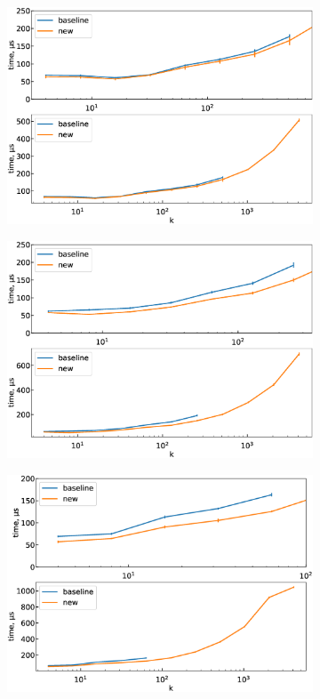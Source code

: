 \documentclass{amsart}
\numberwithin{equation}{section}
\begin{document}
\begin{figure}[t]
    \centering
	\begin{subfigure}[t]{0.3\textwidth}
        \includegraphics[width=\linewidth]{boost_scale_fixed_0_25.eps}
        \caption{}\label{boost-scale-fixed_0_25}
	\end{subfigure}
	\begin{subfigure}[t]{0.3\textwidth}
		\includegraphics[width=\linewidth]{boost_scale_fixed_0_15.eps}
		\caption{}\label{boost-scale-fixed_0_15}
	\end{subfigure}
	\begin{subfigure}[t]{0.3\textwidth}
		\includegraphics[width=\linewidth]{boost_scale_fixed_0_05.eps}

\end{subfigure}
\end{figure}
\end{document}
